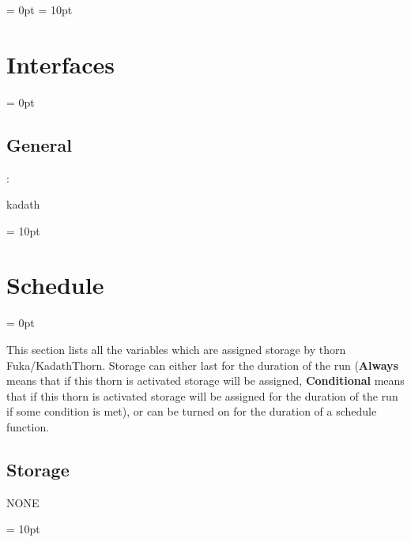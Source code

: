 \parskip = 0pt
\parskip = 10pt 

\section{Interfaces} 


\parskip = 0pt

\vspace{3mm} \subsection*{General}

: 

kadath
\vspace{2mm}

\vspace{5mm}\parskip = 10pt 

\section{Schedule} 


\parskip = 0pt


\noindent This section lists all the variables which are assigned storage by thorn Fuka/KadathThorn.  Storage can either last for the duration of the run ({\bf Always} means that if this thorn is activated storage will be assigned, {\bf Conditional} means that if this thorn is activated storage will be assigned for the duration of the run if some condition is met), or can be turned on for the duration of a schedule function.


\subsection*{Storage}NONE

\vspace{5mm}\parskip = 10pt 

